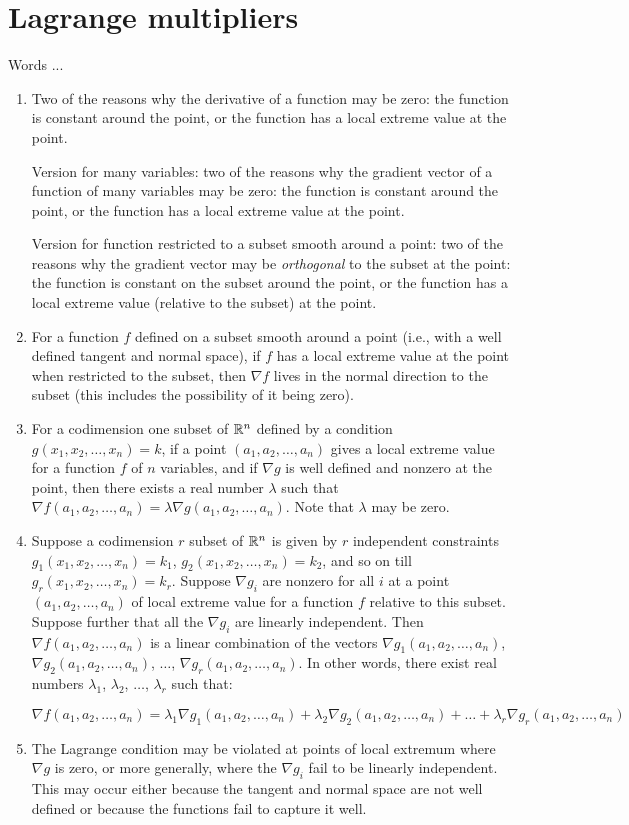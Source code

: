 \documentclass[10pt]{amsart}
\begin{document}
\section{Lagrange multipliers}

Words ...

\begin{enumerate}
\item Two of the reasons why the derivative of a function may be zero:
  the function is constant around the point, or the function has a local
  extreme value at the point.

  Version for many variables: two of the reasons why the gradient
  vector of a function of many variables may be zero: the function is
  constant around the point, or the function has a local extreme value
  at the point.

  Version for function restricted to a subset smooth around a point:
  two of the reasons why the gradient vector may be {\em orthogonal}
  to the subset at the point: the function is constant on the subset
  around the point, or the function has a local extreme value
  (relative to the subset) at the point.
\item For a function $f$ defined on a subset smooth around a point
  (i.e., with a well defined tangent and normal space), if $f$ has a
  local extreme value at the point when restricted to the subset, then
  $\nabla f$ lives in the normal direction to the subset (this
  includes the possibility of it being zero).
\item For a codimension one subset of $\mathbb{R}^n$ defined by a condition
  $g(x_1,x_2,\dots,x_n) = k$, if a point $(a_1,a_2,\dots,a_n)$ gives a
  local extreme value for a function $f$ of $n$ variables, and if
  $\nabla g$ is well defined and nonzero at the point, then there
  exists a real number $\lambda$ such that $\nabla
  f(a_1,a_2,\dots,a_n) = \lambda \nabla g(a_1,a_2,\dots,a_n)$. Note
  that $\lambda$ may be zero.
\item Suppose a codimension $r$ subset of $\mathbb{R}^n$ is given by $r$
  independent constraints $g_1(x_1,x_2,\dots,x_n) = k_1$,
  $g_2(x_1,x_2,\dots,x_n) = k_2$, and so on till
  $g_r(x_1,x_2,\dots,x_n) = k_r$. Suppose $\nabla g_i$ are nonzero for
  all $i$ at a point $(a_1,a_2,\dots,a_n)$ of local extreme value for
  a function $f$ relative to this subset. Suppose further that all the
  $\nabla g_i$ are linearly independent. Then $\nabla
  f(a_1,a_2,\dots,a_n)$ is a linear combination of the vectors $\nabla
  g_1(a_1,a_2,\dots,a_n)$, $\nabla g_2(a_1,a_2,\dots,a_n)$, $\dots$,
  $\nabla g_r(a_1,a_2,\dots,a_n)$. In other words, there exist real
  numbers $\lambda_1$, $\lambda_2$, $\dots$, $\lambda_r$ such that:

  $$\nabla f(a_1,a_2,\dots,a_n) = \lambda_1\nabla g_1(a_1,a_2,\dots,a_n) + \lambda_2\nabla g_2(a_1,a_2,\dots,a_n) + \dots + \lambda_r\nabla g_r(a_1,a_2,\dots,a_n)$$
\item The Lagrange condition may be violated at points of local
  extremum where $\nabla g$ is zero, or more generally, where the
  $\nabla g_i$ fail to be linearly independent. This may occur either
  because the tangent and normal space are not well defined or because
  the functions fail to capture it well.
\end{enumerate}
\end{document}
